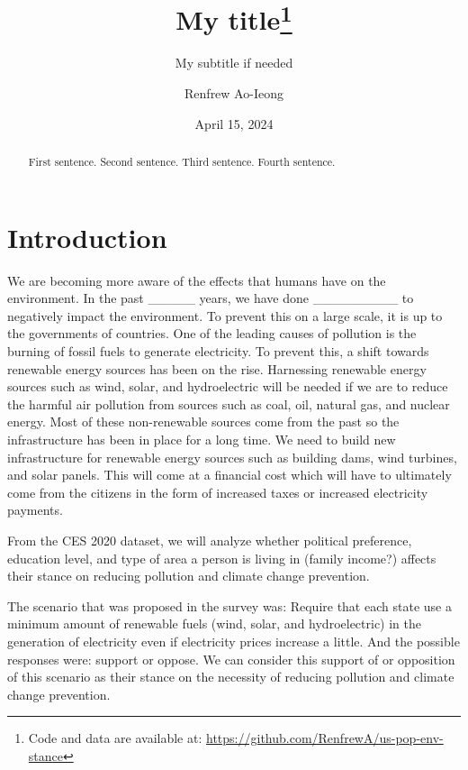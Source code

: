 \documentclass[
  letterpaper,
  DIV=11,
  numbers=noendperiod]{scrartcl}
\title{My title\thanks{Code and data are available at:
\url{https://github.com/RenfrewA/us-pop-env-stance}}}
\subtitle{My subtitle if needed}
\author{Renfrew Ao-Ieong}
\date{April 15, 2024}
\begin{document}
\maketitle
\begin{abstract}
First sentence. Second sentence. Third sentence. Fourth sentence.
\end{abstract}
\ifdefined\Shaded\renewenvironment{Shaded}{\begin{tcolorbox}[interior hidden, borderline west={3pt}{0pt}{shadecolor}, boxrule=0pt, enhanced, breakable, frame hidden, sharp corners]}{\end{tcolorbox}}\fi

\hypertarget{introduction}{%
\section{Introduction}\label{introduction}}

We are becoming more aware of the effects that humans have on the
environment. In the past \_\_\_\_\_ years, we have done
\_\_\_\_\_\_\_\_\_ to negatively impact the environment. To prevent this
on a large scale, it is up to the governments of countries. One of the
leading causes of pollution is the burning of fossil fuels to generate
electricity. To prevent this, a shift towards renewable energy sources
has been on the rise. Harnessing renewable energy sources such as wind,
solar, and hydroelectric will be needed if we are to reduce the harmful
air pollution from sources such as coal, oil, natural gas, and nuclear
energy. Most of these non-renewable sources come from the past so the
infrastructure has been in place for a long time. We need to build new
infrastructure for renewable energy sources such as building dams, wind
turbines, and solar panels. This will come at a financial cost which
will have to ultimately come from the citizens in the form of increased
taxes or increased electricity payments.

From the CES 2020 dataset, we will analyze whether political preference,
education level, and type of area a person is living in (family income?)
affects their stance on reducing pollution and climate change
prevention.

The scenario that was proposed in the survey was: Require that each
state use a minimum amount of renewable fuels (wind, solar, and
hydroelectric) in the generation of electricity even if electricity
prices increase a little. And the possible responses were: support or
oppose. We can consider this support of or opposition of this scenario
as their stance on the necessity of reducing pollution and climate
change prevention.
\end{document}
